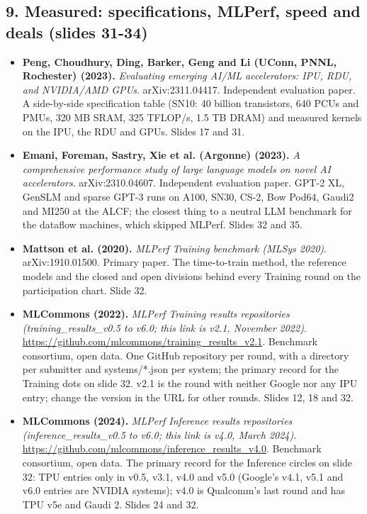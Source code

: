 \documentclass[11pt,letterpaper]{article}
\begin{document}
\subsection*{9. Measured: specifications, MLPerf, speed and deals (slides 31-34)}
\begin{itemize}[leftmargin=1.2em,itemsep=3pt]\sloppy
\item \textbf{Peng, Choudhury, Ding, Barker, Geng and Li (UConn, PNNL, Rochester) (2023).} \textit{Evaluating emerging AI/ML accelerators: IPU, RDU, and NVIDIA/AMD GPUs}. arXiv:2311.04417. Independent evaluation paper. A side-by-side specification table (SN10: 40 billion transistors, 640 PCUs and PMUs, 320 MB SRAM, 325 TFLOP/s, 1.5 TB DRAM) and measured kernels on the IPU, the RDU and GPUs. Slides 17 and 31.
\item \textbf{Emani, Foreman, Sastry, Xie et al. (Argonne) (2023).} \textit{A comprehensive performance study of large language models on novel AI accelerators}. arXiv:2310.04607. Independent evaluation paper. GPT-2 XL, GenSLM and sparse GPT-3 runs on A100, SN30, CS-2, Bow Pod64, Gaudi2 and MI250 at the ALCF; the closest thing to a neutral LLM benchmark for the dataflow machines, which skipped MLPerf. Slides 32 and 35.
\item \textbf{Mattson et al. (2020).} \textit{MLPerf Training benchmark (MLSys 2020)}. arXiv:1910.01500. Primary paper. The time-to-train method, the reference models and the closed and open divisions behind every Training round on the participation chart. Slide 32.
\item \textbf{MLCommons (2022).} \textit{MLPerf Training results repositories (training\_results\_v0.5 to v6.0; this link is v2.1, November 2022)}. \url{https://github.com/mlcommons/training_results_v2.1}. Benchmark consortium, open data. One GitHub repository per round, with a directory per submitter and systems/*.json per system; the primary record for the Training dots on slide 32. v2.1 is the round with neither Google nor any IPU entry; change the version in the URL for other rounds. Slides 12, 18 and 32.
\item \textbf{MLCommons (2024).} \textit{MLPerf Inference results repositories (inference\_results\_v0.5 to v6.0; this link is v4.0, March 2024)}. \url{https://github.com/mlcommons/inference_results_v4.0}. Benchmark consortium, open data. The primary record for the Inference circles on slide 32: TPU entries only in v0.5, v3.1, v4.0 and v5.0 (Google's v4.1, v5.1 and v6.0 entries are NVIDIA systems); v4.0 is Qualcomm's last round and has TPU v5e and Gaudi 2. Slides 24 and 32.

\end{itemize}
\end{document}
